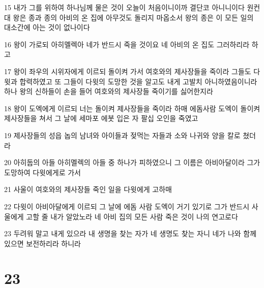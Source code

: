 \par 15 내가 그를 위하여 하나님께 물은 것이 오늘이 처음이니이까 결단코 아니니이다 원컨대 왕은 종과 종의 아비의 온 집에 아무것도 돌리지 마옵소서 왕의 종은 이 모든 일의 대소간에 아는 것이 없나이다
\par 16 왕이 가로되 아히멜렉아 네가 반드시 죽을 것이요 네 아비의 온 집도 그러하리라 하고
\par 17 왕이 좌우의 시위자에게 이르되 돌이켜 가서 여호와의 제사장들을 죽이라 그들도 다윗과 합력하였고 또 그들이 다윗의 도망한 것을 알고도 내게 고발치 아니하였음이니라 하나 왕의 신하들이 손을 들어 여호와의 제사장들 죽이기를 싫어한지라
\par 18 왕이 도엑에게 이르되 너는 돌이켜 제사장들을 죽이라 하매 에돔사람 도엑이 돌이켜 제사장들을 쳐서 그 날에 세마포 에봇 입은 자 팔십 오인을 죽였고
\par 19 제사장들의 성읍 놉의 남녀와 아이들과 젖먹는 자들과 소와 나귀와 양을 칼로 쳤더라
\par 20 아히둡의 아들 아히멜렉의 아들 중 하나가 피하였으니 그 이름은 아비아달이라 그가 도망하여 다윗에게로 가서
\par 21 사울이 여호와의 제사장들 죽인 일을 다윗에게 고하매
\par 22 다윗이 아비아달에게 이르되 그 날에 에돔 사람 도엑이 거기 있기로 그가 반드시 사울에게 고할 줄 내가 알았노라 네 아비 집의 모든 사람 죽은 것이 나의 연고로다
\par 23 두려워 말고 내게 있으라 내 생명을 찾는 자가 네 생명도 찾는 자니 네가 나와 함께 있으면 보전하리라 하니라

\chapter{23}

